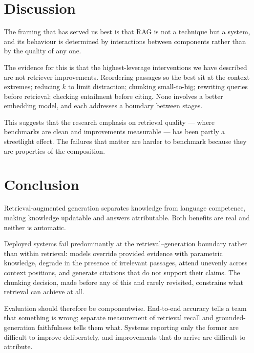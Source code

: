 \documentclass[11pt,a4paper]{article}
\begin{document}
\section{Discussion}
\label{sec:discussion}

The framing that has served us best is that RAG is not a technique but a
system, and its behaviour is determined by interactions between components
rather than by the quality of any one.

The evidence for this is that the highest-leverage interventions we have
described are not retriever improvements. Reordering passages so the best sit
at the context extremes; reducing $k$ to limit distraction; chunking
small-to-big; rewriting queries before retrieval; checking entailment before
citing. None involves a better embedding model, and each addresses a boundary
between stages.

This suggests that the research emphasis on retrieval quality --- where
benchmarks are clean and improvements measurable --- has been partly a
streetlight effect. The failures that matter are harder to benchmark because
they are properties of the composition.

\section{Conclusion}
\label{sec:conclusion}

Retrieval-augmented generation separates knowledge from language competence,
making knowledge updatable and answers attributable. Both benefits are real
and neither is automatic.

Deployed systems fail predominantly at the retrieval--generation boundary
rather than within retrieval: models override provided evidence with
parametric knowledge, degrade in the presence of irrelevant passages, attend
unevenly across context positions, and generate citations that do not support
their claims. The chunking decision, made before any of this and rarely
revisited, constrains what retrieval can achieve at all.

Evaluation should therefore be componentwise. End-to-end accuracy tells a team
that something is wrong; separate measurement of retrieval recall and
grounded-generation faithfulness tells them what. Systems reporting only the
former are difficult to improve deliberately, and improvements that do arrive
are difficult to attribute.
\end{document}
